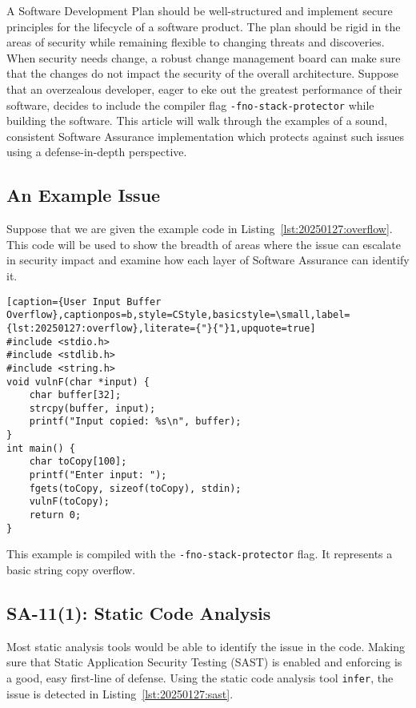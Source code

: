 A Software Development Plan should be well-structured and implement secure principles for the lifecycle of a software product. The plan should be rigid in the areas of security while remaining flexible to changing threats and discoveries. When security needs change, a robust change management board can make sure that the changes do not impact the security of the overall architecture. Suppose that an overzealous developer, eager to eke out the greatest performance of their software, decides to include the compiler flag \texttt{-fno-stack-protector} while building the software. This article will walk through the examples of a sound, consistent Software Assurance implementation which protects against such issues using a defense-in-depth perspective.

\subsection*{An Example Issue}
Suppose that we are given the example code in Listing~\ref{lst:20250127:overflow}. This code will be used to show the breadth of areas where the issue can escalate in security impact and examine how each layer of Software Assurance can identify it.

\begin{lstlisting}[caption={User Input Buffer Overflow},captionpos=b,style=CStyle,basicstyle=\small,label={lst:20250127:overflow},literate={"}{"}1,upquote=true]
#include <stdio.h>
#include <stdlib.h>
#include <string.h>
void vulnF(char *input) {
    char buffer[32];
    strcpy(buffer, input); 
    printf("Input copied: %s\n", buffer);
}
int main() {
    char toCopy[100]; 
    printf("Enter input: ");
    fgets(toCopy, sizeof(toCopy), stdin);
    vulnF(toCopy);
    return 0;
}
\end{lstlisting}

This example is compiled with the \texttt{-fno-stack-protector} flag. It represents a basic string copy overflow.

\subsection*{SA-11(1): Static Code Analysis}
Most static analysis tools would be able to identify the issue in the code. Making sure that Static Application Security Testing (SAST) is enabled and enforcing is a good, easy first-line of defense. Using the static code analysis tool \texttt{infer}, the issue is detected in Listing~\ref{lst:20250127:sast}.

